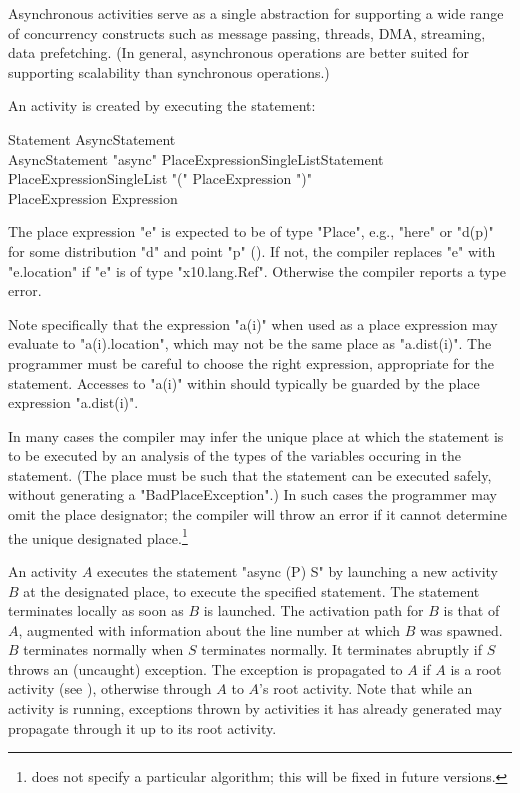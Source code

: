 Asynchronous activities serve as a single abstraction for supporting a
wide range of concurrency constructs such as message passing, threads,
DMA, streaming, data prefetching. (In general, asynchronous operations
are better suited for supporting scalability than synchronous
operations.)

An activity is created by executing the statement:

\begin{grammar}
Statement \: AsyncStatement \\
AsyncStatement \: \xcd"async" PlaceExpressionSingleList\opt Statement \\
PlaceExpressionSingleList \: \xcd"(" PlaceExpression \xcd")" \\
PlaceExpression \: Expression \\
\end{grammar} 

The place expression \xcd"e" is expected to be of type \xcd"Place",
e.g., \xcd"here" or \xcd"d(p)" for some
distribution \xcd"d" and point \xcd"p" ().  
If not, the compiler replaces
\xcd"e" with \xcd"e.location" if
\xcd"e" is of type \xcd"x10.lang.Ref". Otherwise the compiler reports a type error. 

Note specifically that the expression \xcd"a(i)" when used as a place
expression may evaluate to \xcd"a(i).location", which may not be
the same place as \xcd"a.dist(i)". The programmer must be 
careful to choose the right expression, appropriate for the statement.
Accesses to \xcd"a(i)" within  should typically be guarded 
by the place expression \xcd"a.dist(i)".

In many cases the compiler may infer the unique place at which the
statement is to be executed by an analysis of the types of the
variables occuring in the statement. (The place must be such that the
statement can be executed safely, without generating a
\xcd"BadPlaceException".) In such cases the programmer may omit the
place designator; the compiler will throw an error if it cannot
determine the unique designated place.\footnote{\XtenCurrVer{} does
not specify a particular algorithm; this will be fixed in future
versions.}

An activity $A$ executes the statement \xcd"async (P) S" by launching
a new activity $B$ at the designated place, to execute the specified
statement. The statement terminates locally as soon as $B$ is
launched.  The activation path for $B$ is that of $A$, augmented with
information about the line number at which $B$ was spawned.  $B$
terminates normally when $S$ terminates normally.  It terminates
abruptly if $S$ throws an (uncaught) exception. The exception is
propagated to $A$ if $A$ is a root activity (see ),
otherwise through $A$ to $A$'s root activity. Note that while an
activity is running, exceptions thrown by activities it has already
generated may propagate through it up to its root activity.

